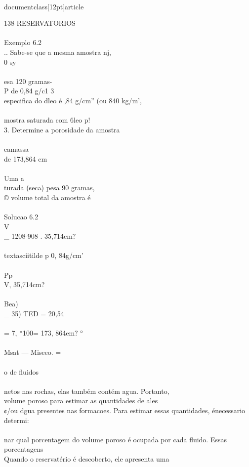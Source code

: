 \\documentclass[12pt]{article}
\begin{document}
138 RESERVATORIOS\\
\\
Exemplo 6.2\\
.. Sabe-se que a mesma amostra nj,\\
0 sy\\
\\
esa 120 gramas-\\
P de 0,84 g/c1 3\\
especifica do dleo é ,84 g/cm” (ou 840 kg/m’,\\
\\
mostra saturada com 6leo p!\\
3. Determine a porosidade da amostra\\
\\
eamassa\\
de 173,864 cm\\
\\
Uma a\\
turada (seca) pesa 90 gramas,\\
© volume total da amostra é\\
\\
Solucao 6.2\\
V \\_ 1208-908 . 35,714cm?\\
\\textasciitilde{} p 0, 84g/cm’\\
\\
Pp\\
V, 35,714cm?\\
\\
Bea) \\_ 35) TED = 20,54\\%
\\
= 7, *100= 173, 864em? °\\
\\
Msat — Miseeo. =\\
\\
o de fluidos\\
\\
netos nas rochas, elas também contém agua. Portanto,\\
volume poroso para estimar as quantidades de ales\\
¢/ou dgua presentes nas formacoes. Para estimar essas quantidades, énecessario determi:\\
\\
nar qual porcentagem do volume poroso é ocupada por cada fluido. Essas porcentagens\\
Quando o reservatério é descoberto, ele apresenta uma\\
\end{document}
